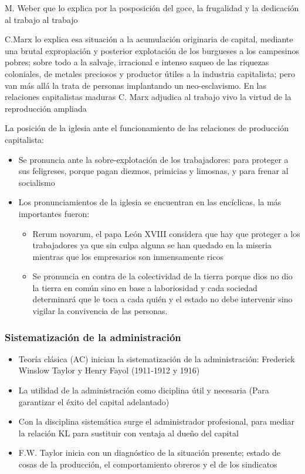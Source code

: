 M. Weber que lo explica por la posposición del goce, la frugalidad y la dedicación al trabajo al trabajo

C.Marx lo explica esa situación a la acumulación originaria de capital, mediante una brutal expropiación y posterior explotación de los burgueses a los campesinos pobres; sobre todo a la salvaje, irracional e intenso saqueo de las riquezas coloniales, de metales preciosos y productor útiles a la industria capitalista; pero van más allá la trata de personas implantando un neo-esclavismo. En las relaciones capitalistas maduras C. Marx adjudica al trabajo vivo la virtud de la reproducción ampliada

La posición de la iglesia ante el funcionamiento de las relaciones de producción capitalista:
\begin{itemize}
    \item Se pronuncia ante la sobre-explotación de los trabajadores: para proteger a sus feligreses, porque pagan diezmos, primicias y limosnas, y para frenar al socialismo
    \item Los pronunciamientos de la iglesia se encuentran en las encíclicas, la más importantes fueron: \begin{itemize}
        \item Rerum novarum, el papa León XVIII considera que hay que proteger a los trabajadores ya que sin culpa alguna se han quedado en la miseria mientras que los empresarios son inmensamente ricos
        \item Se pronuncia en contra de la colectividad de la tierra porque dios no dio la tierra en común sino en base  a laboriosidad y cada sociedad determinará que le toca a cada quién y el estado no debe intervenir sino vigilar la convivencia de las personas.
    \end{itemize}
\end{itemize}
\subsubsection{Sistematización de la administración}
\begin{itemize}
    \item Teoría clásica (AC) inician la sistematización de la administración: Frederick Winslow Taylor y Henry Fayol (1911-1912 y 1916)
    \item La utilidad de la administración como diciplina útil y necesaria (Para garantizar el éxito del capital adelantado)
    \item Con la disciplina sistemática surge el administrador profesional, para mediar la relación KL para sustituir con ventaja al dueño del capital
    \item F.W. Taylor inicia con un diagnóstico de la situación presente; estado de cosas de la producción, el comportamiento obreros y el de los sindicatos 
\end{itemize}

